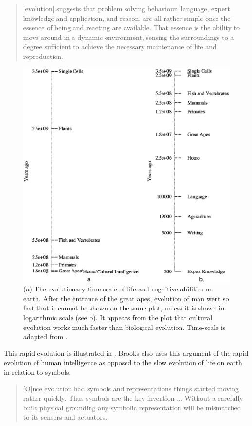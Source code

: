 \begin{quote}
[evolution] suggests that problem solving behaviour, language, expert know\-ledge and application, and reason, are all rather simple once the essence of being and reacting are available. That essence is the ability to move around in a dynamic environment, sensing the surroundings to a degree sufficient to achieve the necessary maintenance of life and reproduction. \citep{brooks:1990}
\end{quote}

\begin{figure}
\centerline{\includegraphics[width=12cm]{theory/evol.eps}}
\caption{(a) The evolutionary time-scale of life and cognitive abilities on earth. After the entrance of the great apes, evolution of man went so fast that it cannot be shown on the same plot, unless it is shown in logarithmic scale (see b). It appears from the plot that cultural evolution works much faster than biological evolution. Time-scale is adapted from \citet{brooks:1990}.}
\label{f:theory:evolution}
\end{figure}

This rapid evolution is illustrated in . Brooks also uses this argument of the rapid evolution of human intelligence as opposed to the slow evolution of life on earth in relation to symbols.

\begin{quote}
[O]nce evolution had symbols and representations things started moving rather quickly. Thus symbols are the key invention ... Without a carefully built physical grounding any symbolic representation will be mismatched to its sensors and actuators. \citep{brooks:1990}
\end{quote}

